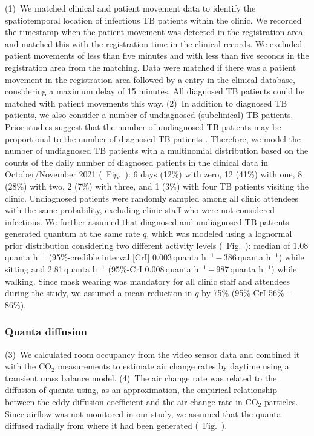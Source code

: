 \documentclass[fleqn,11pt]{wlscirep}
\begin{document}
(1)~We matched clinical and patient movement data to identify the spatiotemporal location of infectious TB patients within the clinic. We recorded the timestamp when the patient movement was detected in the registration area and matched this with the registration time in the clinical records. We excluded patient movements of less than five minutes and with less than five seconds in the registration area from the matching. Data were matched if there was a patient movement in the registration area followed by a entry in the clinical database, considering a maximum delay of 15 minutes. All diagnosed TB patients could be matched with patient movements this way. (2)~In addition to diagnosed TB patients, we also consider a number of undiagnosed (subclinical) TB patients. Prior studies suggest that the number of undiagnosed TB patients may be proportional to the number of diagnosed TB patients \cite{Berhanu2023CID,Moyo2022LancetID,Patterson2024PNAS}. Therefore, we model the number of undiagnosed TB patients with a multinomial distribution based on the counts of the daily number of diagnosed patients in the clinical data in October/November 2021 (\supp~Fig.~): 6 days (12\%) with zero, 12 (41\%) with one, 8 (28\%) with two, 2 (7\%) with three, and 1 (3\%) with four TB patients visiting the clinic. Undiagnosed patients were randomly sampled among all clinic attendees with the same probability, excluding clinic staff who were not considered infectious. We further assumed that diagnosed and undiagnosed TB patients generated quantum at the same rate $q$, which was modeled using a lognormal prior distribution considering two different activity levels (\supp~Fig.~): median of 1.08\,quanta h$^{-1}$ (95\%-credible interval [CrI] 0.003\,quanta h$^{-1}$\,$-$\,386\,quanta h$^{-1}$) while sitting and 2.81\,quanta h$^{-1}$ (95\%-CrI 0.008\,quanta h$^{-1}$\,$-$\,987\,quanta h$^{-1}$) while walking\cite{Mikszewski2021GF,Buonanno2020EI,Banholzer2024PGPH}. Since mask wearing was mandatory for all clinic staff and attendees during the study, we assumed a mean reduction in $q$ by 75\% (95\%-CrI 56\%\,$-$\,86\%)\cite{Dharmadhikari2012AJRCCM,McCreesh2021BMJGlobalHealth}.

\subsubsection*{Quanta diffusion}

(3)~We calculated room occupancy from the video sensor data and combined it with the CO$_2$ measurements to estimate air change rates by daytime using a transient mass balance model\cite{Batterman2017IJERPH}. (4)~The air change rate was related to the diffusion of quanta using, as an approximation, the empirical relationship between the eddy diffusion coefficient and the air change rate in CO$_2$ particles\cite{Cheng2011EnvSciTech,Foat2020BE}. Since airflow was not monitored in our study, we assumed that the quanta diffused radially from where it had been generated (\supp~Fig.~). 
\end{document}
